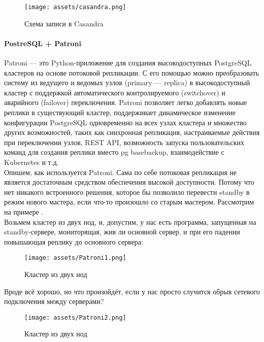 \begin{figure}[h]
    \centering
    \texttt{[image: assets/casandra.png]}
    \caption{Схема записи в Casandra}
    \label{fig:mesh2}
\end{figure}

\paragraph{PostreSQL + Patroni}

Patroni — это Python-приложение для создания высокодоступных PostgreSQL кластеров на основе потоковой репликации. С его помощью можно преобразовать систему из ведущего и ведомых узлов (primary — replica) в высокодоступный кластер с поддержкой автоматического контролируемого (switchover) и аварийного (failover) переключения. Patroni позволяет легко добавлять новые реплики в существующий кластер, поддерживает динамическое изменение конфигурации PostgreSQL одновременно на всех узлах кластера и множество других возможностей, таких как синхронная репликация, настраиваемые действия при переключении узлов, REST API, возможность запуска пользовательских команд для создания реплики вместо pg basebackup, взаимодействие с Kubernetes и т.д. \autocite{Klyukin} \\

Опишем, как используется Patroni. Сама по себе потоковая репликация не является достаточным средством обеспечения высокой доступности. Потому что нет никакого встроенного решения, которое бы позволило перевести standby в режим нового мастера, если что-то произошло со старым мастером. Рассмотрим на примере \autocite{Aristov}.\\
Возьмем кластер из двух нод, и, допустим, у нас есть программа, запущенная на standby-сервере, мониторящая, жив ли основной сервер, и при его падении повышающая реплику до основного сервера:

\begin{figure}[h]
    \centering
    \texttt{[image: assets/Patroni1.png]}
    \caption{Кластер из двух нод}
    \label{fig:mesh3}
\end{figure}

Вроде всё хорошо, но что произойдёт, если у нас просто случится обрыв сетевого подключения между серверами?

\begin{figure}[h]
    \centering
    \texttt{[image: assets/Patroni2.png]}
    \caption{Кластер из двух нод}
    \label{fig:mesh4}
\end{figure}

